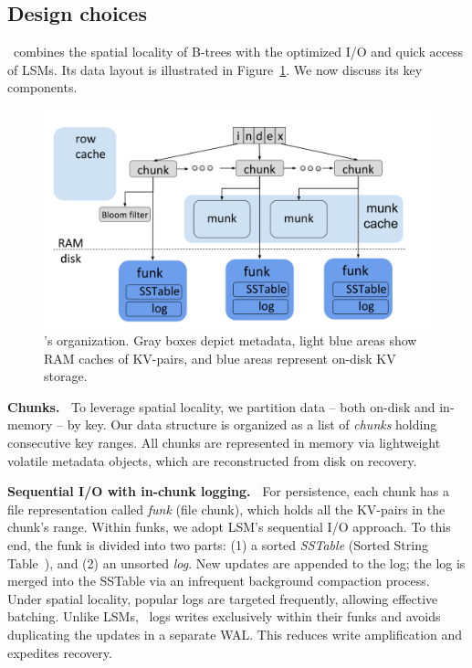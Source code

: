 \subsection{Design choices}

\sys\ combines the spatial locality of B-trees with the optimized I/O and quick access of LSMs. 
Its data layout is illustrated in Figure~\ref{fig:piwi}.  We now discuss its key components.   

\begin{figure}[tb]
\includegraphics[width=\columnwidth]{PiWi.png}
\caption{\sys's  organization. Gray boxes depict metadata, light blue areas show RAM caches of KV-pairs, and blue areas represent on-disk KV storage.}
\label{fig:piwi}
\end{figure}


{\bf Chunks.\ }
To leverage spatial locality, we partition data -- both on-disk and in-memory -- by key.
Our  data structure is organized as a 
list of \emph{chunks} holding consecutive key ranges. 
All chunks are represented in memory via lightweight volatile metadata objects, which are reconstructed from disk on recovery.

{\bf Sequential I/O with in-chunk logging.\ }
For persistence, each chunk has a file representation called  \emph{funk} (file chunk), which holds all the KV-pairs in the chunk's range.
Within funks, we adopt LSM's sequential I/O approach. To this end, the funk 
is divided into two parts: (1) a sorted \emph{SSTable} (Sorted String Table~\cite{Bigtable2008}), and (2) an unsorted \emph{log}. 
New updates are appended to the log; the log is  merged into the SSTable via an infrequent background compaction process. 
Under spatial locality,  popular logs are targeted frequently, allowing effective batching. 
Unlike LSMs, \sys\ logs writes exclusively within their funks and avoids duplicating the updates  in a separate WAL. This reduces write amplification and expedites recovery. 

